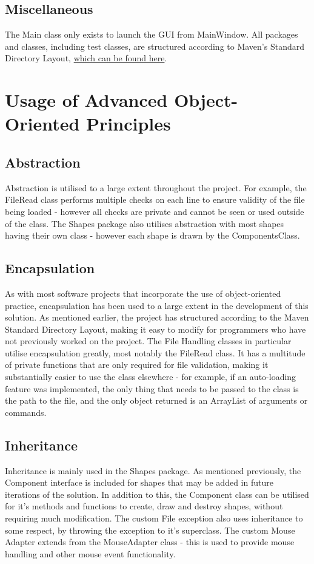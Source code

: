 \documentclass[12pt]{article} %
\begin{document}
\subsection{Miscellaneous}
The Main class only exists to launch the GUI from MainWindow. All packages and classes, including test classes, are structured according to Maven's Standard Directory Layout, {\color{blue} \href{https://maven.apache.org/guides/introduction/introduction-to-the-standard-directory-layout.html}{which can be found here}}.
\newpage

\section{Usage of Advanced Object-Oriented Principles}
\subsection{Abstraction}
Abstraction is utilised to a large extent throughout the project. For example, the FileRead class performs multiple checks on each line to ensure validity of the file being loaded - however all checks are private and cannot be seen or used outside of the class.  The Shapes package also utilises abstraction with most shapes having their own class - however each shape is drawn by the ComponentsClass.
\subsection{Encapsulation}
As with most software projects that incorporate the use of object-oriented practice, encapsulation has been used to a large extent in the development of this solution. As mentioned earlier, the project has structured according to the Maven Standard Directory Layout, making it easy to modify for programmers who have not previously worked on the project. The File Handling classes in particular utilise encapsulation greatly, most notably the FileRead class. It has a multitude of private functions that are only required for file validation, making it substantially easier to use the class elsewhere - for example, if an auto-loading feature was implemented, the only thing that needs to be passed to the class is the path to the file, and the only object returned is an ArrayList of arguments or commands.
\subsection{Inheritance}
Inheritance is mainly used in the Shapes package. As mentioned previously, the Component interface is included for shapes that may be added in future iterations of the solution. In addition to this, the Component class can be utilised for it's methods and functions to create, draw and destroy shapes, without requiring much modification. The custom File exception also uses inheritance to some respect, by throwing the exception to it's superclass. The custom Mouse Adapter extends from the MouseAdapter class - this is used to provide mouse handling and other mouse event functionality.
\end{document}
